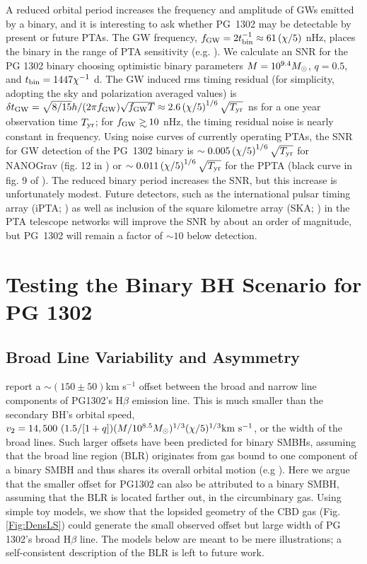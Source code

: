 A reduced orbital period increases the frequency and amplitude of
GWs emitted by a binary, and it is interesting
to ask whether PG~1302 may be detectable by present or future PTAs. The GW frequency, $f_{\rm{GW}}  = 2 t^{-1}_{\rm{bin}}
\approx 61 \left( \chi/5 \right)$ nHz, places the binary in the range
of PTA sensitivity (e.g. \citealt{HobbsIPTA+2010}). We calculate an SNR for the PG 1302 binary
choosing optimistic binary parameters $M=10^{9.4} {M_{\odot}}$, $q=0.5$, and
$t_{\rm{bin}} = 1447\chi^{-1}$ d. 
The GW induced rms timing residual (for simplicity, adopting the sky and
polarization averaged values) is 
$\delta t_{\rm{GW}}  = \sqrt{8/15} h/(2 \pi f_{\rm{GW}} ) \sqrt{f_{\rm{GW}}  T} \approx 2.6 \left( \chi/5 \right)^{1/6} \sqrt{T_{\rm yr}}$ ns 
for a one year observation time $T_{\rm yr}$; for
$f_{\rm{GW}} \gsim10$ nHz, the timing residual noise is nearly constant in
frequency. Using noise curves of currently operating PTAs, the SNR for
GW detection of the PG~1302 binary is $\sim 0.005 \left(\chi / 5
\right)^{1/6}  \sqrt{T_{\rm yr}}$ for NANOGrav (fig. 12 in \citealt{NANOGrav2014:SC}) or
$\sim 0.011 \left( \chi / 5 \right)^{1/6}  \sqrt{T_{\rm yr}}$ for the PPTA (black curve in
fig. 9 of \citealt{PPTA:2014:SC}). The reduced binary period increases
the SNR, but this increase is unfortunately modest. Future detectors,
such as the international pulsar timing array (iPTA;
\citealt{ManchesterIPTA:2013}) as well as inclusion of the square kilometre
array (SKA; \citealt{SKA:2009:OP}) in the PTA telescope networks will
improve the SNR by about an order of magnitude, but PG~1302 will
remain a factor of $\sim10$ below detection.




\section{Testing the Binary BH Scenario for PG 1302}
\label{S:Predictions}
\subsection{Broad Line Variability and Asymmetry}
\label{SS:BLs}



\cite{Jackson:1992:PGHbeta} report 
a $\sim (150\pm 50)$km s$^{-1}$ offset between the broad and narrow
line components of PG1302's H$\beta$ emission line. This is much
smaller than the secondary BH's orbital
speed,\\ $v_2=14,500~(1.5/[1+q])(M/10^{8.5}M_\odot)^{1/3}(\chi/5)^{1/3}{\rm
  km~s^{-1}}$, or the width of the broad lines. Such larger offsets
have been predicted for binary SMBHs, assuming that the broad line
region (BLR) originates from gas bound to one component of a binary
SMBH and thus shares its overall orbital motion (e.g
\citealt{Tsalmantza:2011}).  Here we argue that the smaller offset for
PG1302 can also be attributed to a binary SMBH, assuming that the BLR
is located farther out, in the circumbinary gas.  Using simple toy
models, we show that the lopsided geometry of the CBD gas
(Fig. \ref{Fig:DensLS}) could generate the small observed offset but
large width of PG 1302's broad H$\beta$ line.  The models below are
meant to be mere illustrations; a self-consistent description of the
BLR is left to future work.

